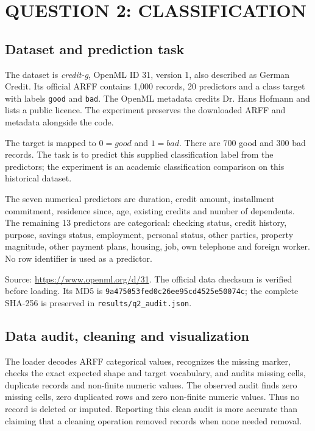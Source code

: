 
\clearpage
\chapter{QUESTION 2: CLASSIFICATION}
\section{Dataset and prediction task}
The dataset is \textit{credit-g}, OpenML ID 31, version 1, also described as German Credit. Its official ARFF contains 1,000 records, 20 predictors and a class target with labels \texttt{good} and \texttt{bad}. The OpenML metadata credits Dr. Hans Hofmann and lists a public licence. The experiment preserves the downloaded ARFF and metadata alongside the code.

The target is mapped to $0=good$ and $1=bad$. There are 700 good and 300 bad records. The task is to predict this supplied classification label from the predictors; the experiment is an academic classification comparison on this historical dataset.

The seven numerical predictors are duration, credit amount, installment commitment, residence since, age, existing credits and number of dependents. The remaining 13 predictors are categorical: checking status, credit history, purpose, savings status, employment, personal status, other parties, property magnitude, other payment plans, housing, job, own telephone and foreign worker. No row identifier is used as a predictor.

\noindent Source: \url{https://www.openml.org/d/31}. The official data checksum is verified before loading. Its MD5 is \texttt{9a475053fed0c26ee95cd4525e50074c}; the complete SHA-256 is preserved in \texttt{results/q2\_audit.json}.

\section{Data audit, cleaning and visualization}
The loader decodes ARFF categorical values, recognizes the missing marker, checks the exact expected shape and target vocabulary, and audits missing cells, duplicate records and non-finite numeric values. The observed audit finds zero missing cells, zero duplicated rows and zero non-finite numeric values. Thus no record is deleted or imputed. Reporting this clean audit is more accurate than claiming that a cleaning operation removed records when none needed removal.

